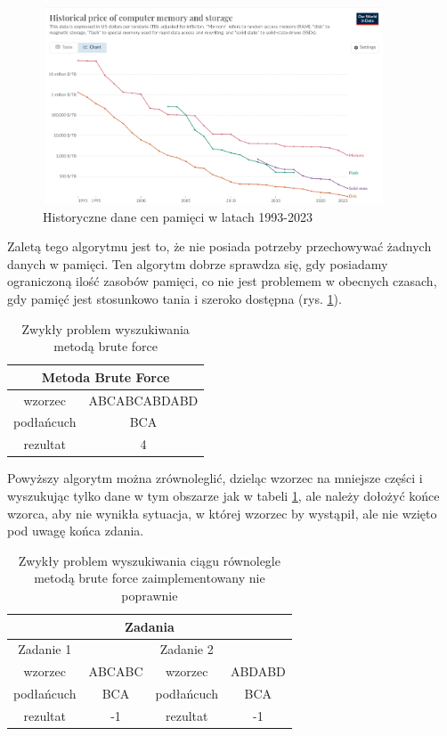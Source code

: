 \begin{figure}[h]
  \centering
  \includegraphics[width=0.9\textwidth]{./images/historical-mem-price.png}
  \caption{Historyczne dane cen pamięci w latach 1993-2023}
  \label{screenshot:MemPrices}
\end{figure}
Zaletą tego algorytmu jest to, że nie posiada potrzeby przechowywać żadnych 
danych w pamięci. Ten algorytm dobrze sprawdza się, gdy posiadamy ograniczoną 
ilość zasobów pamięci, co nie jest problemem w obecnych czasach, gdy pamięć jest
stosunkowo tania i szeroko dostępna (rys. \ref{screenshot:MemPrices}).

\begin{table}
  \centering
  \begin{tabular}{ |c|c|  } 
    \hline
    \multicolumn{2}{|c|}{Metoda Brute Force} \\
    \hline
    wzorzec & ABCABCABDABD \\
    \hline
    podłańcuch & BCA \\
    \hline
    rezultat & 4 \\
    \hline
  \end{tabular}
  \caption{Zwykły problem wyszukiwania metodą brute force}
  \label{tabela:NormalProblemBruteForce}
\end{table}

Powyższy algorytm można zrównoleglić, dzieląc wzorzec na mniejsze części
i wyszukując tylko dane w tym obszarze jak w tabeli \ref{tabela:NormalProblemBruteForce}, 
ale należy dołożyć końce wzorca, aby nie wynikła sytuacja, w której wzorzec by
wystąpił, ale nie wzięto pod uwagę końca zdania. 

\begin{table}
  \centering
  \begin{tabular}{ |c|c||c|c|  } 
    \hline
    \multicolumn{4}{|c|}{Zadania} \\
    \hline
    Zadanie 1 & & Zadanie 2 & \\
    \hline
    wzorzec & ABCABC & wzorzec & ABDABD \\
    \hline
    podłańcuch & BCA & podłańcuch & BCA \\
    \hline
    rezultat & -1 & rezultat & -1 \\ 
    \hline
  \end{tabular}
  \caption{Zwykły problem wyszukiwania ciągu równolegle metodą brute force 
  zaimplementowany nie poprawnie}
  \label{tabela:splitTasksBruteForce}
\end{table}


